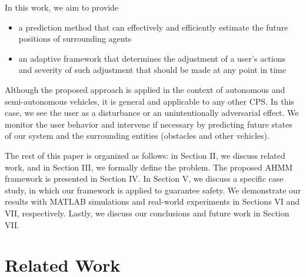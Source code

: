 \documentclass[conference]{IEEEtran}
\begin{document}
     In this work, we aim to provide
    \begin{itemize}
    \item{a prediction method that can effectively and efficiently estimate the future positions of surrounding agents}
    \item{an adaptive framework that determines the adjustment of a user's actions and severity of such adjustment that should be made at any point in time}
    \end{itemize}
  
   Although the proposed approach is applied in the context of autonomous and semi-autonomous vehicles, it is general and applicable to any other CPS. In this case, we see the user as a disturbance or an unintentionally adversarial effect. We monitor the user behavior and intervene if necessary by predicting future states of our system and the surrounding entities (obstacles and other vehicles).    
    
    The rest of this paper is organized as follows: in Section II, we discuss related work, and in Section III, we formally define the problem. The proposed AHMM framework is presented in Section IV. In Section V, we discuss a specific case study, in which our framework is applied to guarantee safety. We demonstrate our results with MATLAB simulations and real-world experiments in Sections VI and VII, respectively. Lastly, we discuss our conclusions and future work in Section VII.

    

\section{Related Work}

    
    
    
\end{document}
